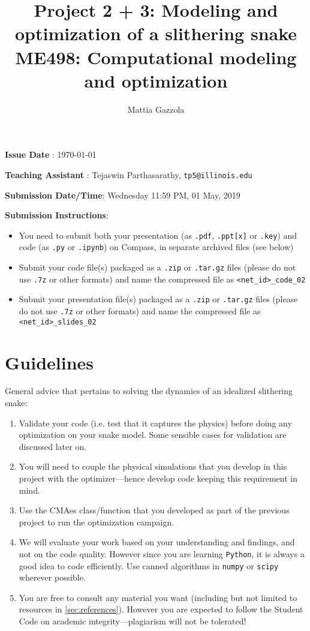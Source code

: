 \documentclass[11pt]{article}
\author{Mattia Gazzola}
\date{}
\title{Project 2 + 3: Modeling and optimization of a slithering snake\\\medskip
\large ME498: Computational modeling and optimization}
\begin{document}
\maketitle
\textbf{Issue Date} : \today

\textbf{Teaching Assistant} : Tejaswin Parthasarathy, \texttt{tp5@illinois.edu}

\textbf{Submission Date/Time}: Wednesday 11:59 PM, 01 May, 2019

\textbf{Submission Instructions}:
\begin{itemize}
\item You need to submit both your presentation (as \texttt{.pdf}, \texttt{.ppt[x]} or \texttt{.key}) and code
(as \texttt{.py} or \texttt{.ipynb}) on Compass, in separate archived files (see below)
\item Submit your code file(s) packaged as a \texttt{.zip} or \texttt{.tar.gz} files (please do not use
\texttt{.7z} or other formats) and name the compressed file as \texttt{<net\_id>\_code\_02}
\item Submit your presentation file(s) packaged as a \texttt{.zip} or \texttt{.tar.gz} files (please do not use
\texttt{.7z} or other formats) and name the compressed file as \texttt{<net\_id>\_slides\_02}
\end{itemize}

\newpage

\section{Guidelines}
\label{sec:org867312c}
General advice that pertains to solving the dynamics of an idealized
slithering snake:
\begin{enumerate}
\item Validate your code (i.e. test that it captures the physics) before doing
any optimization on your snake model. Some sensible cases for validation are
discussed later on.
\item You will need to couple the physical simulations that you develop in this
project with the optimizer---hence develop code keeping this requirement in mind.
\item Use the CMAes class/function that you developed as part of the previous
project to run the optimization campaign.
\item We will evaluate your work based on your understanding and findings, and
not on the code quality. However since you are learning \texttt{Python}, it is
always a good idea to code efficiently. Use canned algorithms in \texttt{numpy} or
\texttt{scipy} wherever possible.
\item You are free to consult any material you want (including but not limited to
resources in \cref{sec:references}). However you are expected to follow the
Student Code on academic integrity---plagiarism will not be tolerated!
\end{enumerate}
\end{document}
